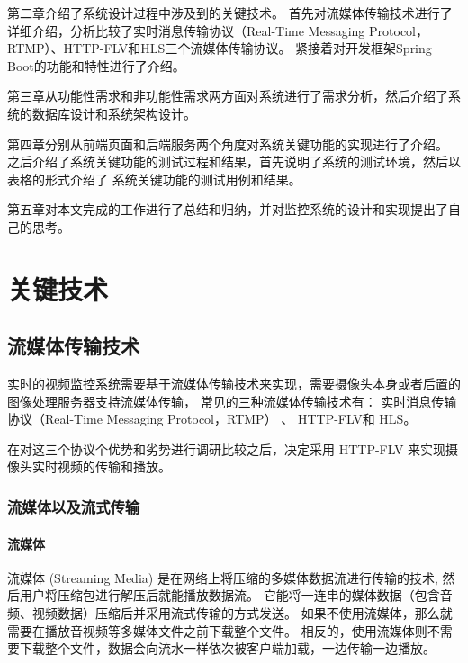 第二章介绍了系统设计过程中涉及到的关键技术。
首先对流媒体传输技术进行了详细介绍，分析比较了实时消息传输协议（Real-Time Messaging Protocol，RTMP）、HTTP-FLV和HLS三个流媒体传输协议。
紧接着对开发框架Spring Boot的功能和特性进行了介绍。


第三章从功能性需求和非功能性需求两方面对系统进行了需求分析，然后介绍了系统的数据库设计和系统架构设计。

第四章分别从前端页面和后端服务两个角度对系统关键功能的实现进行了介绍。
之后介绍了系统关键功能的测试过程和结果，首先说明了系统的测试环境，然后以表格的形式介绍了
系统关键功能的测试用例和结果。


第五章对本文完成的工作进行了总结和归纳，并对监控系统的设计和实现提出了自己的思考。

\chapter{关键技术}
\section{流媒体传输技术}
实时的视频监控系统需要基于流媒体传输技术来实现，需要摄像头本身或者后置的图像处理服务器支持流媒体传输，
常见的三种流媒体传输技术有：
实时消息传输协议（Real-Time Messaging Protocol，RTMP） 、
HTTP-FLV和
HLS。

在对这三个协议个优势和劣势进行调研比较之后，决定采用
HTTP-FLV 来实现摄像头实时视频的传输和播放。

\subsection{流媒体以及流式传输}
\subsubsection{流媒体}
流媒体 (Streaming Media) 是在网络上将压缩的多媒体数据流进行传输的技术, 然后用户将压缩包进行解压后就能播放数据流\cite{万梅芬2018基于流媒体技术的数字化校园文化设计与实现}。
它能将一连串的媒体数据（包含音频、视频数据）压缩后并采用流式传输的方式发送。
如果不使用流媒体，那么就需要在播放音视频等多媒体文件之前下载整个文件。
相反的，使用流媒体则不需要下载整个文件，数据会向流水一样依次被客户端加载，一边传输一边播放。

